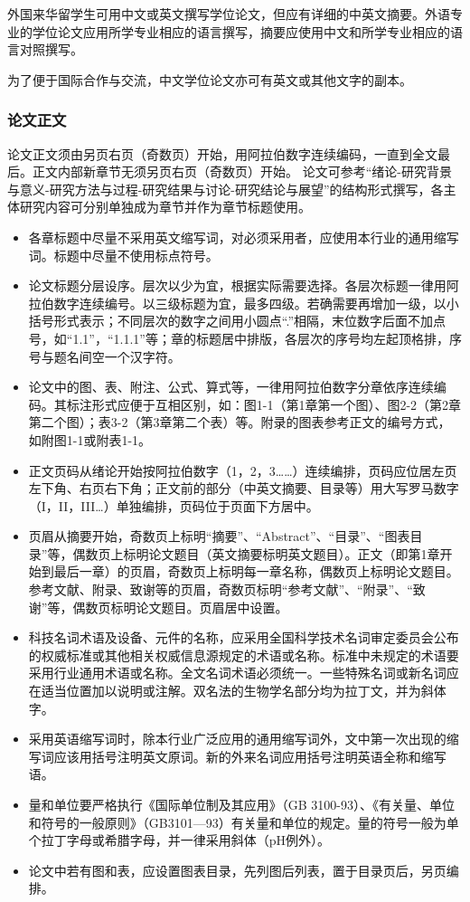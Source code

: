 外国来华留学生可用中文或英文撰写学位论文，但应有详细的中英文摘要。外语专业的学位论文应用所学专业相应的语言撰写，摘要应使用中文和所学专业相应的语言对照撰写。

为了便于国际合作与交流，中文学位论文亦可有英文或其他文字的副本。

\subsubsection{论文正文}

论文正文须由另页右页（奇数页）开始，用阿拉伯数字连续编码，一直到全文最后。正文内部新章节无须另页右页（奇数页）开始。
    论文可参考“绪论-研究背景与意义-研究方法与过程-研究结果与讨论-研究结论与展望”的结构形式撰写，各主体研究内容可分别单独成为章节并作为章节标题使用。

\begin{itemize}
    \item 各章标题中尽量不采用英文缩写词，对必须采用者，应使用本行业的通用缩写词。标题中尽量不使用标点符号。
    \item 论文标题分层设序。层次以少为宜，根据实际需要选择。各层次标题一律用阿拉伯数字连续编号。以三级标题为宜，最多四级。若确需要再增加一级，以小括号形式表示；不同层次的数字之间用小圆点“.”相隔，末位数字后面不加点号，如“1.1”，“1.1.1”等；章的标题居中排版，各层次的序号均左起顶格排，序号与题名间空一个汉字符。
    \item 论文中的图、表、附注、公式、算式等，一律用阿拉伯数字分章依序连续编码。其标注形式应便于互相区别，如：图1-1（第1章第一个图）、图2-2（第2章第二个图）；表3-2（第3章第二个表）等。附录的图表参考正文的编号方式，如附图1-1或附表1-1。
    \item 正文页码从绪论开始按阿拉伯数字（1，2，3……）连续编排，页码应位居左页左下角、右页右下角；正文前的部分（中英文摘要、目录等）用大写罗马数字（I，II，III…）单独编排，页码位于页面下方居中。
    \item 页眉从摘要开始，奇数页上标明“摘要”、“Abstract”、“目录”、“图表目录”等，偶数页上标明论文题目（英文摘要标明英文题目）。正文（即第1章开始到最后一章）的页眉，奇数页上标明每一章名称，偶数页上标明论文题目。参考文献、附录、致谢等的页眉，奇数页标明“参考文献”、“附录”、“致谢”等，偶数页标明论文题目。页眉居中设置。
    \item 科技名词术语及设备、元件的名称，应采用全国科学技术名词审定委员会公布的权威标准或其他相关权威信息源规定的术语或名称。标准中未规定的术语要采用行业通用术语或名称。全文名词术语必须统一。一些特殊名词或新名词应在适当位置加以说明或注解。双名法的生物学名部分均为拉丁文，并为斜体字。
    \item 采用英语缩写词时，除本行业广泛应用的通用缩写词外，文中第一次出现的缩写词应该用括号注明英文原词。新的外来名词应用括号注明英语全称和缩写语。
    \item 量和单位要严格执行《国际单位制及其应用》（GB 3100-93）、《有关量、单位和符号的一般原则》（GB3101—93）有关量和单位的规定。量的符号一般为单个拉丁字母或希腊字母，并一律采用斜体（pH例外）。
    \item 论文中若有图和表，应设置图表目录，先列图后列表，置于目录页后，另页编排。
\end{itemize}

